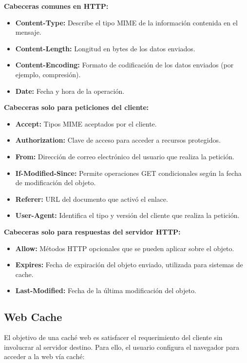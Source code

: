 \documentclass[a4paper,12pt]{article}
\begin{document}
\textbf{Cabeceras comunes en HTTP:}
\begin{itemize}
    \item \textbf{Content-Type:} Describe el tipo MIME de la información contenida en el mensaje.
    \item \textbf{Content-Length:} Longitud en bytes de los datos enviados.
    \item \textbf{Content-Encoding:} Formato de codificación de los datos enviados (por ejemplo, compresión).
    \item \textbf{Date:} Fecha y hora de la operación.
\end{itemize}

\textbf{Cabeceras solo para peticiones del cliente:}
\begin{itemize}
    \item \textbf{Accept:} Tipos MIME aceptados por el cliente.
    \item \textbf{Authorization:} Clave de acceso para acceder a recursos protegidos.
    \item \textbf{From:} Dirección de correo electrónico del usuario que realiza la petición.
    \item \textbf{If-Modified-Since:} Permite operaciones GET condicionales según la fecha de modificación del objeto.
    \item \textbf{Referer:} URL del documento que activó el enlace.
    \item \textbf{User-Agent:} Identifica el tipo y versión del cliente que realiza la petición.
\end{itemize}

\textbf{Cabeceras solo para respuestas del servidor HTTP:}
\begin{itemize}
    \item \textbf{Allow:} Métodos HTTP opcionales que se pueden aplicar sobre el objeto.
    \item \textbf{Expires:} Fecha de expiración del objeto enviado, utilizada para sistemas de cache.
    \item \textbf{Last-Modified:} Fecha de la última modificación del objeto.
\end{itemize}

\subsection{Web Cache}

El objetivo de una caché web es satisfacer el requerimiento del cliente sin involucrar al servidor destino. Para ello, el usuario configura el navegador para acceder a la web vía caché:
\end{document}
